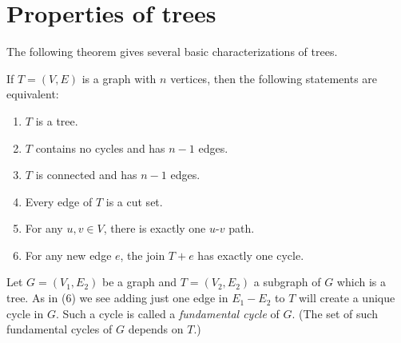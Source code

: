 
\section{Properties of trees}

%

The following theorem gives several basic
characterizations of trees.

\begin{theorem}
If $T = (V, E)$ is a graph with $n$ vertices, then the following
statements are equivalent:
\begin{enumerate}
\item $T$ is a tree.

\item $T$ contains no cycles and has $n - 1$ edges.

\item $T$ is connected and has $n - 1$ edges.

\item Every edge of $T$ is a cut set.

\item For any $u,v \in V$, there is exactly one $u$-$v$ path.

\item For any new edge $e$, the join $T + e$ has exactly one cycle.
\end{enumerate}
\end{theorem}

Let $G=(V_1,E_2)$ be a graph and $T=(V_2,E_2)$ a subgraph of $G$ which is a tree.
As in (6) we see adding just one edge in $E_1-E_2$ to $T$ will create a
unique cycle in $G$. Such a cycle is called a {\it fundamental cycle}
of $G$. (The set of such fundamental cycles of $G$ depends on $T$.)

